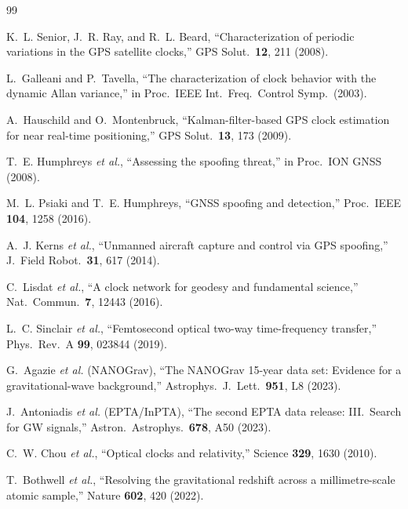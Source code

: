 \documentclass[12pt,letterpaper]{article}
\begin{document}
\begin{thebibliography}{99}

K.~L. Senior, J.~R. Ray, and R.~L. Beard,
``Characterization of periodic variations in the GPS satellite clocks,''
GPS Solut.\ \textbf{12}, 211 (2008).

L.~Galleani and P.~Tavella,
``The characterization of clock behavior with the dynamic Allan
variance,''
in Proc.\ IEEE Int.\ Freq.\ Control Symp.\ (2003).

A.~Hauschild and O.~Montenbruck,
``Kalman-filter-based GPS clock estimation for near real-time
positioning,''
GPS Solut.\ \textbf{13}, 173 (2009).

T.~E. Humphreys \textit{et al.},
``Assessing the spoofing threat,''
in Proc.\ ION GNSS (2008).

M.~L. Psiaki and T.~E. Humphreys,
``GNSS spoofing and detection,''
Proc.\ IEEE \textbf{104}, 1258 (2016).

A.~J. Kerns \textit{et al.},
``Unmanned aircraft capture and control via GPS spoofing,''
J.\ Field Robot.\ \textbf{31}, 617 (2014).

C.~Lisdat \textit{et al.},
``A clock network for geodesy and fundamental science,''
Nat.\ Commun.\ \textbf{7}, 12443 (2016).

L.~C. Sinclair \textit{et al.},
``Femtosecond optical two-way time-frequency transfer,''
Phys.\ Rev.\ A \textbf{99}, 023844 (2019).

G.~Agazie \textit{et al.} (NANOGrav),
``The NANOGrav 15-year data set: Evidence for a gravitational-wave
background,''
Astrophys.\ J.\ Lett.\ \textbf{951}, L8 (2023).

J.~Antoniadis \textit{et al.} (EPTA/InPTA),
``The second EPTA data release: III.\ Search for GW signals,''
Astron.\ Astrophys.\ \textbf{678}, A50 (2023).

C.~W. Chou \textit{et al.},
``Optical clocks and relativity,''
Science \textbf{329}, 1630 (2010).

T.~Bothwell \textit{et al.},
``Resolving the gravitational redshift across a millimetre-scale atomic
sample,''
Nature \textbf{602}, 420 (2022).


\end{thebibliography}
\end{document}
